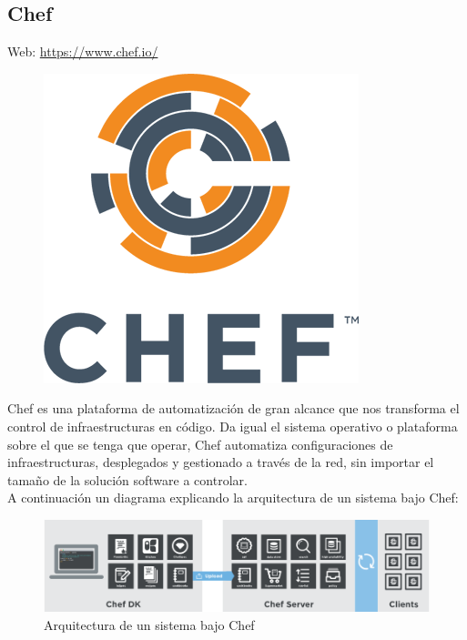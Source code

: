\subsection{Chef}
Web: \url{https://www.chef.io/}\\
\begin{figure}[H]
  \begin{center}
    \includegraphics[scale=0.3]{diagramas/chef-logo.png}
  \end{center}
\end{figure}

Chef es una plataforma de automatización de gran alcance que nos transforma el control de infraestructuras en código. Da igual el sistema operativo o plataforma sobre el que se tenga que operar, Chef automatiza configuraciones de infraestructuras, desplegados y gestionado a través de la red, sin importar el tamaño de la solución software a controlar.\\

A continuación un diagrama explicando la arquitectura de un sistema bajo Chef:

\begin{figure}[H]
  \begin{center}
  \includegraphics[scale=1]{diagramas/chef.png}
  \caption{Arquitectura de un sistema bajo Chef}
  \end{center}
\end{figure}

